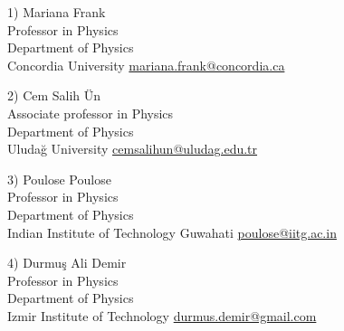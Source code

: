 \documentclass[]{friggeri-cv}
\begin{document}
	\begin{entrylist}
		
		\entry
		{1)}
		{Mariana Frank \\ \normalfont
			Professor in Physics \\
			Department of Physics \\
			Concordia University}
		{\href{mariana.frank@concordia.ca}{mariana.frank@concordia.ca}} 
		
	
		   \entry
	    {2)}
    	{Cem Salih Ün  \\ \normalfont
		Associate professor in Physics \\
		Department of Physics \\
		Uludağ University}
	{\href{cemsalihun@uludag.edu.tr}{cemsalihun@uludag.edu.tr}} 
	
		
		\entry
		{3)}
		{Poulose Poulose \\ \normalfont
			Professor in Physics \\
			Department of Physics \\
			Indian Institute of Technology Guwahati}
		{\href{poulose@iitg.ac.in}{poulose@iitg.ac.in}} 
		
		
		
		\entry
		{4)}
		{Durmuş Ali Demir \\ \normalfont
			Professor in Physics \\
			Department of Physics \\
			Izmir Institute of Technology}
		{\href{durmus.demir@gmail.com}{durmus.demir@gmail.com}} 
		
		
	\end{entrylist}
\end{document}
